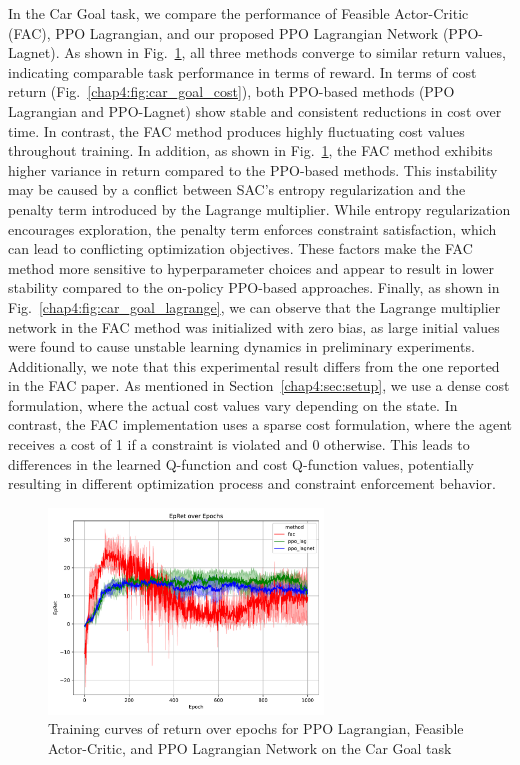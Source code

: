 In the Car Goal task, we compare the performance of Feasible Actor-Critic (FAC), PPO Lagrangian, and our proposed PPO Lagrangian Network (PPO-Lagnet).
As shown in Fig.~\ref{chap4:fig:car_goal_return}, all three methods converge to similar return values, indicating comparable task performance in terms of reward.
In terms of cost return (Fig.~\ref{chap4:fig:car_goal_cost}), both PPO-based methods (PPO Lagrangian and PPO-Lagnet) show stable and consistent reductions in cost over time.
In contrast, the FAC method produces highly fluctuating cost values throughout training.
In addition, as shown in Fig.~\ref{chap4:fig:car_goal_return}, the FAC method exhibits higher variance in return compared to the PPO-based methods.
This instability may be caused by a conflict between SAC’s entropy regularization and the penalty term introduced by the Lagrange multiplier.
While entropy regularization encourages exploration, the penalty term enforces constraint satisfaction, which can lead to conflicting optimization objectives.
These factors make the FAC method more sensitive to hyperparameter choices and appear to result in lower stability compared to the on-policy PPO-based approaches.
Finally, as shown in Fig.~\ref{chap4:fig:car_goal_lagrange}, we can observe that the Lagrange multiplier network in the FAC method was initialized with zero bias, as large initial values were found to cause unstable learning dynamics in preliminary experiments.
Additionally, we note that this experimental result differs from the one reported in the FAC paper.
As mentioned in Section~\ref{chap4:sec:setup}, we use a dense cost formulation, where the actual cost values vary depending on the state.
In contrast, the FAC implementation uses a sparse cost formulation, where the agent receives a cost of 1 if a constraint is violated and 0 otherwise.
This leads to differences in the learned Q-function and cost Q-function values, potentially resulting in different optimization process and constraint enforcement behavior.

\begin{figure}[h]
  \centering
  \includegraphics[width=0.65\textwidth]{imgs/chap4/car_goal/return.pdf}
  \caption{Training curves of return over epochs for PPO Lagrangian, Feasible Actor-Critic, and PPO Lagrangian Network on the Car Goal task}
  \label{chap4:fig:car_goal_return}
\end{figure}

